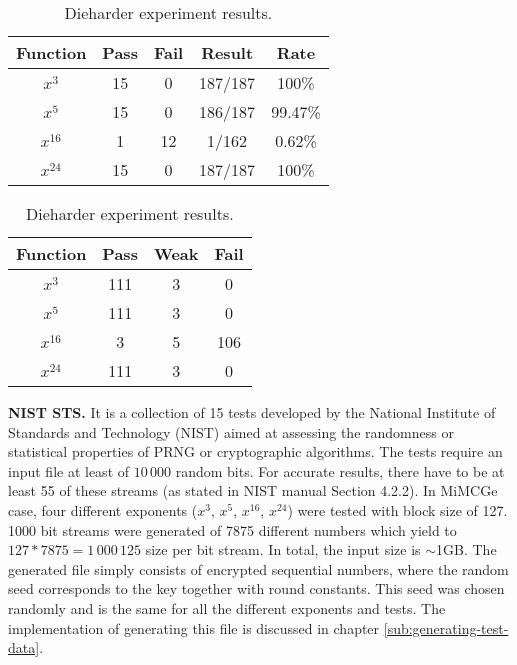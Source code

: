 \documentclass{Resources/UoBLab1}
\theoremstyle{definition}
\begin{document}
\begin{table}[]
    \begin{minipage}{.5\textwidth}
        \centering
        \begin{tabular}{|c|c|c|c|c|}
            \hline
            Function & Pass & Fail & Result & Rate \\
            \hline
            $x^3$ & 15 & 0 & 187/187 & 100\% \\
            $x^5$ & 15 & 0 & 186/187 & 99.47\% \\
            $x^{16}$ & 1 & 12 & 1/162 & 0.62\% \\
            $x^{24}$ & 15 & 0 & 187/187 & 100\% \\
            \hline
        \end{tabular}
        \caption{NIST test results.}\label{tab:NIST-results}
    \end{minipage}%
    \begin{minipage}{.5\textwidth}
        \centering
        \begin{tabular}{|c|c|c|c|}
            \hline
            Function & Pass & Weak & Fail \\
            \hline
            $x^3$ & 111 & 3 & 0 \\
            $x^5$ & 111 & 3 & 0 \\
            $x^{16}$ & 3 & 5 & 106 \\
            $x^{24}$ & 111 & 3 & 0 \\
            \hline
        \end{tabular}
        \caption{Dieharder experiment results.}\label{tab:dieharder-results}
    \end{minipage}
\end{table}

\noindent\textbf{NIST STS.} It is a collection of 15 tests developed by the National Institute of Standards and Technology (NIST) aimed at assessing the randomness or statistical properties of PRNG or cryptographic algorithms. The tests require an input file at least of $10\,000$ random bits. For accurate results, there have to be at least 55 of these streams (as stated in NIST manual Section 4.2.2\cite{NIST}). In MiMCGe case, four different exponents ($x^3$, $x^5$, $x^{16}$, $x^{24}$) were tested with block size of 127. 1000 bit streams were generated of 7875 different numbers which yield to $127 * 7875 = 1\,000\,125$ size per bit stream. In total, the input size is $\sim$1GB. The generated file simply consists of encrypted sequential numbers, where the random seed corresponds to the key together with round constants. This seed was chosen randomly and is the same for all the different exponents and tests. The implementation of generating this file is discussed in chapter \ref{sub:generating-test-data}.
\end{document}
